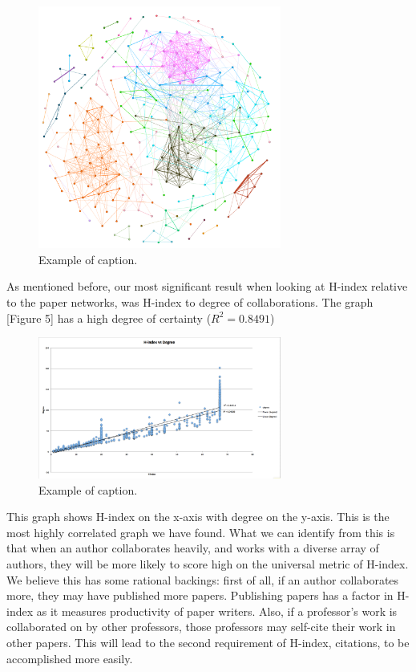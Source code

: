 \documentclass[times, 10pt,twocolumn]{article}
\begin{document}
\begin{figure}[h]
   \includegraphics[width=8cm]{figure4.png}
   \caption{Example of caption.}
\end{figure}

As mentioned before, our most significant result when looking at H-index relative to the paper networks, was H-index to degree of collaborations. The graph [Figure 5] has a high
degree of certainty ($R^2 = 0.8491$)  \\

\begin{figure}[h]
   \includegraphics[width=8cm]{figure5.png}
   \caption{Example of caption.}
\end{figure}

This graph shows H-index on the x-axis with degree on the y-axis. This is the most highly correlated graph we have found. What we can identify from this is that when an author collaborates heavily, and works with a diverse array of authors, they will be more likely to score high on the universal metric of H-index. \\

We believe this has some rational backings: first of all, if an author collaborates more, they may have published more papers. Publishing papers has a factor in H-index as it measures productivity of paper writers. Also, if a professor’s work is collaborated on by other professors, those professors may self-cite their work in other papers. This will lead to the second requirement of H-index, citations, to be accomplished more easily. \\
\end{document}
